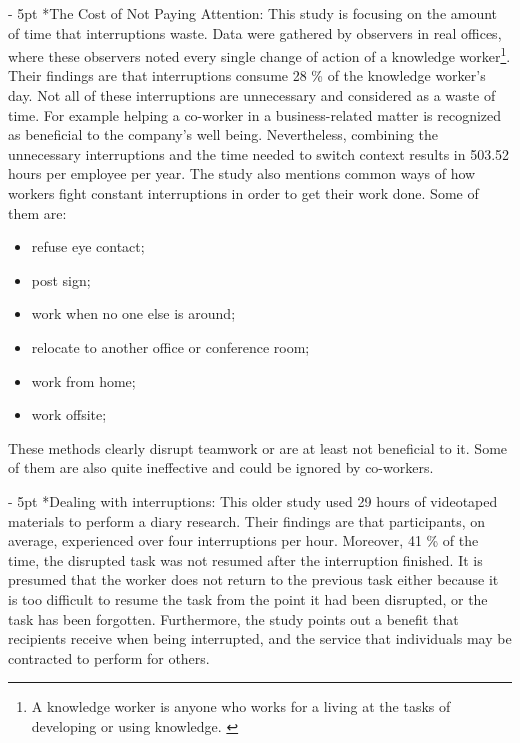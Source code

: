 \documentclass[11pt,singleside]{myfithesis2}
\makeatletter
\renewcommand\paragraph{
   \vspace{-10pt}
   \@startsection{paragraph}{4}{0mm}
      {\baselineskip}
      {- 5pt}
      {\normalfont\normalsize\bfseries}
}
\makeatother
\begin{document}
\paragraph*{The Cost of Not Paying Attention: } This study \cite{studyAttention} is focusing on the amount of time that interruptions waste. Data were gathered by observers in real offices, where these observers noted every single change of action of a knowledge worker\footnote{A knowledge worker is anyone who works for a living at the tasks of developing or using knowledge. \cite{knowledgeWorker}}. Their findings are that interruptions consume 28 \% of the knowledge worker's day. Not all of these interruptions are unnecessary and considered as a waste of time. For example helping a co-worker in a business-related matter is recognized as beneficial to the company's well being. Nevertheless, combining the unnecessary interruptions and the time needed to switch context results in 503.52 hours per employee per year. The study also mentions common ways of how workers fight constant interruptions in order to get their work done. Some of them are: \label{list:avoidingCommunication}
\begin{itemize}
	\item refuse eye contact;
	\item post sign;
	\item work when no one else is around;
	\item relocate to another office or conference room;
	\item work from home;
	\item work offsite;
\end{itemize}
These methods clearly disrupt teamwork or are at least not beneficial to it. Some of them are also quite ineffective and could be ignored by co-workers.
\paragraph*{Dealing with interruptions: } This older study \cite{studyDealingWithInterruptions} used 29 hours of videotaped materials to perform a diary research. Their findings are that participants, on average, experienced over four interruptions per hour. Moreover, 41 \% of the time, the disrupted task was not resumed after the interruption finished. It is presumed that the worker does not return to the previous task either because it is too difficult to resume the task from the point it had been disrupted, or the task has been forgotten. Furthermore, the study points out a benefit that recipients receive when being interrupted, and the service that individuals may be contracted to perform for others.
\end{document}
